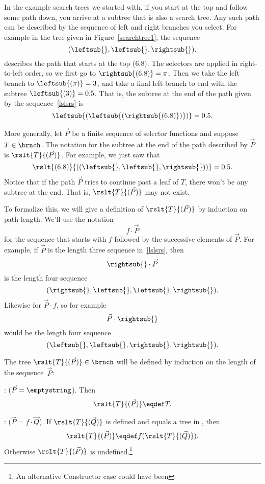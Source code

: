 \begin{definition}
In the example search trees we started with, if you start at the top
and follow some path down, you arrive at a subtree that is also a
search tree.  Any such path can be described by the sequence of left
and right branches you select.  For example in the tree given in
Figure~\ref{searchtree1}, the sequence
\begin{equation}\label{lslsrs}
(\leftsub{},\leftsub{},\rightsub{}).
\end{equation}
describes the path that starts at the top (6.8).  The selectors are
applied in right-to-left order, so we first go to $\rightsub{(6.8)} =
\pi$.  Then we take the left branch to $\leftsub{(\pi)} = 3$, and take a
final left branch to end with the subtree $\leftsub{(3)} = 0.5$.  That
is, the subtree at the end of the path given by the sequence~\eqref{lslsrs} is
\[
\leftsub{(\leftsub{(\rightsub{(6.8)})})} = 0.5.
\]

More generally, let $\vec{P}$ be a finite sequence of selector
functions and suppose $T \in \brnch$.  The notation for the subtree at
the end of the path described by $\vec{P}$ is $\rslt{T}{(\vec{P})}$.
For example, we just saw that
\[
\rslt{(6.8)}{((\leftsub{},\leftsub{},\rightsub{}))} = 0.5.
\]
Notice that if the path $\vec{P}$ tries to continue past a leaf of
$T$, there won't be any subtree at the end.  That is,
$\rslt{T}{(\vec{P})}$ may not exist.

To formalize this, we will give a definition of $\rslt{T}{(\vec{P})}$
by induction on path length.  We'll use the notation
\[
f \cdot \vec{P}
\]
for the sequence that starts with $f$ followed by the successive
elements of $\vec{P}$.  For example, if $\vec{P}$ is the length three
sequence in~\eqref{lslsrs}, then
\[
\rightsub{} \cdot \vec{P}
\]
is the length four sequence
\[
(\rightsub{}, \leftsub{},\leftsub{},\rightsub{}).
\]
Likewise for $\vec{P} \cdot f$, so for example
\[
 \vec{P} \cdot \rightsub{}
\]
would be the length four sequence
\[
(\leftsub{},\leftsub{},\rightsub{},\rightsub{}).
\]

\begin{definition}
The tree $\rslt{T}{(\vec{P})} \in \brnch$ will be defined by induction
on the length of the sequence~$\vec{P}$:

: ($\vec{P} = \emptystring$).
Then
\[
\rslt{T}{(\vec{P})} \eqdef T.
\]

: ($\vec{P} = f \cdot \vec{Q}$).  If
$\rslt{T}{(\vec{Q})}$ is defined and equals a tree in \brnchng, then
\[
\rslt{T}{(\vec{P})} \eqdef f(\rslt{T}{(\vec{Q})}).
\]
Otherwise $\rslt{T}{(\vec{P})}$ is undefined.\footnote{An alternative
  Constructor case could have been

}
\end{definition}
\end{definition}
